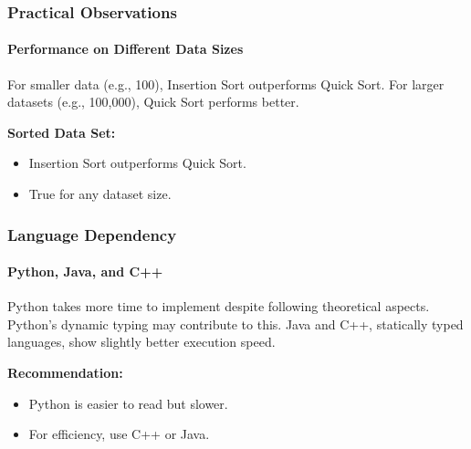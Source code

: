 \begin{frame}
  \frametitle{Practical Observations}
  \framesubtitle{Performance on Different Data Sizes}

  For smaller data (e.g., 100), Insertion Sort outperforms Quick Sort. For larger datasets (e.g., 100,000), Quick Sort performs better.

  \vspace{1em}

  \textbf{Sorted Data Set:}
  \begin{itemize}
    \item Insertion Sort outperforms Quick Sort.
    \item True for any dataset size.
  \end{itemize}
\end{frame}

\begin{frame}
  \frametitle{Language Dependency}
  \framesubtitle{Python, Java, and C++}

  Python takes more time to implement despite following theoretical aspects. Python's dynamic typing may contribute to this. Java and C++, statically typed languages, show slightly better execution speed.

  \vspace{1em}

  \textbf{Recommendation:}
  \begin{itemize}
    \item Python is easier to read but slower.
    \item For efficiency, use C++ or Java.
  \end{itemize}
  
\end{frame}

